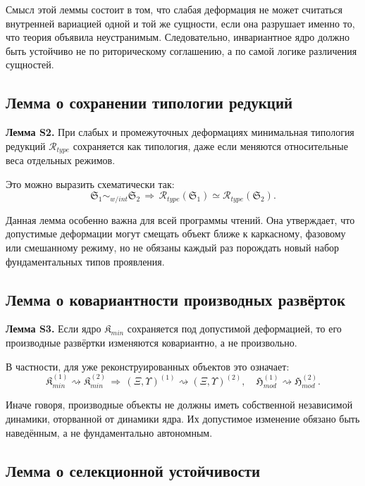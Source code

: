 \documentclass[12pt,a4paper]{article}
\begin{document}
Смысл этой леммы состоит в том, что слабая деформация не может считаться внутренней вариацией одной и той же сущности, если она разрушает именно то, что теория объявила неустранимым. Следовательно, инвариантное ядро должно быть устойчиво не по риторическому соглашению, а по самой логике различения сущностей.

\subsection{Лемма о сохранении типологии редукций}

\textbf{Лемма S2.} При слабых и промежуточных деформациях минимальная типология редукций \(\mathcal{R}_{type}\) сохраняется как типология, даже если меняются относительные веса отдельных режимов.

Это можно выразить схематически так:
\begin{equation}
\mathfrak{S}_1 \sim_{w/int} \mathfrak{S}_2
\,\Longrightarrow\,
\mathcal{R}_{type}(\mathfrak{S}_1)\simeq \mathcal{R}_{type}(\mathfrak{S}_2).
\end{equation}

Данная лемма особенно важна для всей программы чтений. Она утверждает, что допустимые деформации могут смещать объект ближе к каркасному, фазовому или смешанному режиму, но не обязаны каждый раз порождать новый набор фундаментальных типов проявления.

\subsection{Лемма о ковариантности производных развёрток}

\textbf{Лемма S3.} Если ядро \(\mathfrak{K}_{min}\) сохраняется под допустимой деформацией, то его производные развёртки изменяются ковариантно, а не произвольно.

В частности, для уже реконструированных объектов это означает:
\begin{equation}
\mathfrak{K}_{min}^{(1)} \rightsquigarrow \mathfrak{K}_{min}^{(2)}
\,\Longrightarrow\,
(\Xi,\Upsilon)^{(1)} \rightsquigarrow (\Xi,\Upsilon)^{(2)},
\quad
\mathfrak{H}_{mod}^{(1)} \rightsquigarrow \mathfrak{H}_{mod}^{(2)}.
\end{equation}

Иначе говоря, производные объекты не должны иметь собственной независимой динамики, оторванной от динамики ядра. Их допустимое изменение обязано быть наведённым, а не фундаментально автономным.

\subsection{Лемма о селекционной устойчивости}
\end{document}
